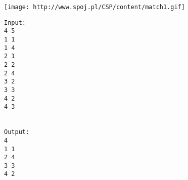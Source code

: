\texttt{[image: http://www.spoj.pl/CSP/content/match1.gif]}
\begin{verbatim}
Input:
4 5
1 1
1 4
2 1
2 2
2 4
3 2
3 3
4 2
4 3


Output:
4
1 1
2 4
3 3
4 2

\end{verbatim}